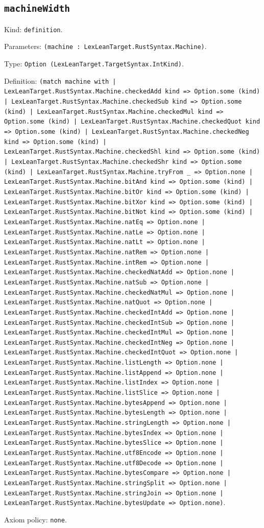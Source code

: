 \documentclass[11pt]{article}
\begin{document}
\subsection*{\texttt{machineWidth}}
\noindent Kind: \texttt{definition}.\par
\noindent Parameters: \texttt{(machine : LexLeanTarget.RustSyntax.Machine)}.\par
\noindent Type: \texttt{Option (LexLeanTarget.TargetSyntax.IntKind)}.\par
\noindent Definition: \texttt{(match machine with | LexLeanTarget.RustSyntax.Machine.checkedAdd kind => Option.some (kind) | LexLeanTarget.RustSyntax.Machine.checkedSub kind => Option.some (kind) | LexLeanTarget.RustSyntax.Machine.checkedMul kind => Option.some (kind) | LexLeanTarget.RustSyntax.Machine.checkedQuot kind => Option.some (kind) | LexLeanTarget.RustSyntax.Machine.checkedNeg kind => Option.some (kind) | LexLeanTarget.RustSyntax.Machine.checkedShl kind => Option.some (kind) | LexLeanTarget.RustSyntax.Machine.checkedShr kind => Option.some (kind) | LexLeanTarget.RustSyntax.Machine.tryFrom \_ => Option.none | LexLeanTarget.RustSyntax.Machine.bitAnd kind => Option.some (kind) | LexLeanTarget.RustSyntax.Machine.bitOr kind => Option.some (kind) | LexLeanTarget.RustSyntax.Machine.bitXor kind => Option.some (kind) | LexLeanTarget.RustSyntax.Machine.bitNot kind => Option.some (kind) | LexLeanTarget.RustSyntax.Machine.natEq => Option.none | LexLeanTarget.RustSyntax.Machine.natLe => Option.none | LexLeanTarget.RustSyntax.Machine.natLt => Option.none | LexLeanTarget.RustSyntax.Machine.natRem => Option.none | LexLeanTarget.RustSyntax.Machine.intRem => Option.none | LexLeanTarget.RustSyntax.Machine.checkedNatAdd => Option.none | LexLeanTarget.RustSyntax.Machine.natSub => Option.none | LexLeanTarget.RustSyntax.Machine.checkedNatMul => Option.none | LexLeanTarget.RustSyntax.Machine.natQuot => Option.none | LexLeanTarget.RustSyntax.Machine.checkedIntAdd => Option.none | LexLeanTarget.RustSyntax.Machine.checkedIntSub => Option.none | LexLeanTarget.RustSyntax.Machine.checkedIntMul => Option.none | LexLeanTarget.RustSyntax.Machine.checkedIntNeg => Option.none | LexLeanTarget.RustSyntax.Machine.checkedIntQuot => Option.none | LexLeanTarget.RustSyntax.Machine.listLength => Option.none | LexLeanTarget.RustSyntax.Machine.listAppend => Option.none | LexLeanTarget.RustSyntax.Machine.listIndex => Option.none | LexLeanTarget.RustSyntax.Machine.listSlice => Option.none | LexLeanTarget.RustSyntax.Machine.bytesAppend => Option.none | LexLeanTarget.RustSyntax.Machine.bytesLength => Option.none | LexLeanTarget.RustSyntax.Machine.stringLength => Option.none | LexLeanTarget.RustSyntax.Machine.bytesIndex => Option.none | LexLeanTarget.RustSyntax.Machine.bytesSlice => Option.none | LexLeanTarget.RustSyntax.Machine.utf8Encode => Option.none | LexLeanTarget.RustSyntax.Machine.utf8Decode => Option.none | LexLeanTarget.RustSyntax.Machine.bytesCompare => Option.none | LexLeanTarget.RustSyntax.Machine.stringSplit => Option.none | LexLeanTarget.RustSyntax.Machine.stringJoin => Option.none | LexLeanTarget.RustSyntax.Machine.bytesUpdate => Option.none)}.\par
\noindent Axiom policy: \texttt{none}.\par
\end{document}
